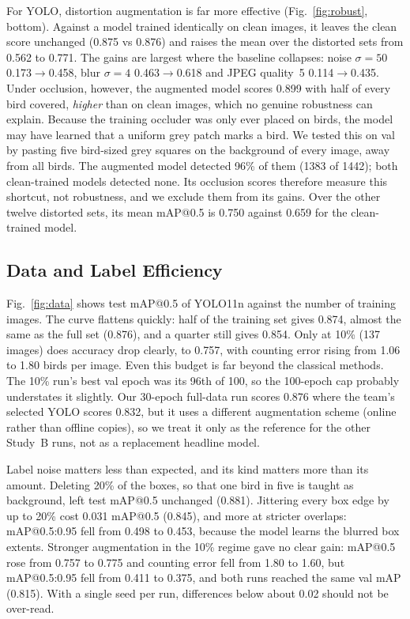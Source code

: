For YOLO, distortion augmentation is far more effective (Fig.~\ref{fig:robust}, bottom). Against
a model trained identically on clean images, it leaves the clean score unchanged (0.875 vs
0.876) and raises the mean over the distorted sets from 0.562 to 0.771. The gains are largest
where the baseline collapses: noise $\sigma=50$ 0.173$\rightarrow$0.458, blur $\sigma=4$
0.463$\rightarrow$0.618 and JPEG quality~5 0.114$\rightarrow$0.435. Under occlusion, however,
the augmented model scores 0.899 with half of every bird covered, \emph{higher} than on clean
images, which no genuine robustness can explain. Because the training occluder was only ever
placed on birds, the model may have learned that a uniform grey patch marks a bird. We tested
this on val by pasting five bird-sized grey squares on the background of every image, away from
all birds. The augmented model detected 96\% of them (1383 of 1442); both clean-trained models
detected none. Its occlusion scores therefore measure this shortcut, not robustness, and we
exclude them from its gains. Over the other twelve distorted sets, its mean mAP@0.5 is 0.750
against 0.659 for the clean-trained model.

\subsection{Data and Label Efficiency}
\label{sec:res-data}

Fig.~\ref{fig:data} shows test mAP@0.5 of YOLO11n against the number of training images. The
curve flattens quickly: half of the training set gives 0.874, almost the same as the full set
(0.876), and a quarter still gives 0.854. Only at 10\% (137 images) does accuracy drop clearly,
to 0.757, with counting error rising from 1.06 to 1.80 birds per image. Even this budget is
far beyond the classical methods. The 10\% run's best val epoch was its 96th of 100, so the
100-epoch cap probably understates it slightly. Our 30-epoch full-data run scores 0.876 where the team's
selected YOLO scores 0.832, but it uses a different augmentation scheme (online rather than
offline copies), so we treat it only as the reference for the other Study~B runs, not as a
replacement headline model.

Label noise matters less than expected, and its kind matters more than its amount. Deleting
20\% of the boxes, so that one bird in five is taught as background, left test mAP@0.5
unchanged (0.881). Jittering every box edge by up to 20\% cost 0.031 mAP@0.5 (0.845), and more
at stricter overlaps: mAP@0.5:0.95 fell from 0.498 to 0.453, because the model learns the
blurred box extents. Stronger augmentation in the 10\% regime gave no clear gain: mAP@0.5 rose
from 0.757 to 0.775 and counting error fell from 1.80 to 1.60, but mAP@0.5:0.95 fell from 0.411
to 0.375, and both runs reached the same val mAP (0.815). With a single seed per run,
differences below about 0.02 should not be over-read.

